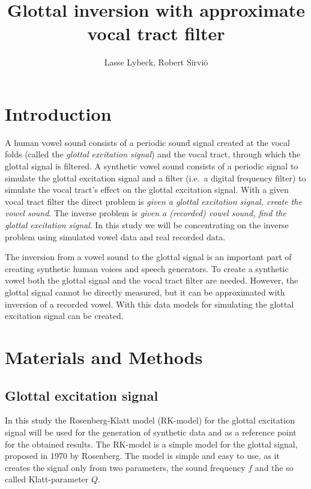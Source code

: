 \documentclass[12pt,a4]{article}
\title{Glottal inversion with approximate vocal tract filter}
\author{Lasse Lybeck, Robert Sirviö}
\begin{document}
\maketitle

\section{Introduction}
\label{sec:intro}

A human vowel sound consists of a periodic sound signal created at the vocal folds (called the \emph{glottal excitation signal}) and the vocal tract, through which the glottal signal is filtered. A synthetic vowel sound consists of a periodic signal to simulate the glottal excitation signal and a filter (i.e.\ a digital frequency filter) to simulate the vocal tract's effect on the glottal excitation signal.\cite{touda} With a given vocal tract filter the direct problem is \emph{given a glottal excitation signal, create the vowel sound}. The inverse problem is \emph{given a (recorded) vowel sound, find the glottal excitation signal}. In this study we will be concentrating on the inverse problem using simulated vowel data and real recorded data.

The inversion from a vowel sound to the glottal signal is an important part of creating synthetic human voices and speech generators. To create a synthetic vowel both the glottal signal and the vocal tract filter are needed. However, the glottal signal cannot be directly measured, but it can be approximated with inversion of a recorded vowel. With this data models for simulating the glottal excitation signal can be created.


\section{Materials and Methods}
\label{sec:methods}

\subsection{Glottal excitation signal}
\label{sec:rk}

In this study the Rosenberg-Klatt model (RK-model) for the glottal excitation signal will be used for the generation of synthetic data and as a reference point for the obtained results. The RK-model is a simple model for the glottal signal, proposed in 1970 by Rosenberg.\cite{rosenberg} The model is simple and easy to use, as it creates the signal only from two parameters, the sound frequency $f$ and the so called Klatt-parameter $Q$.
\end{document}
